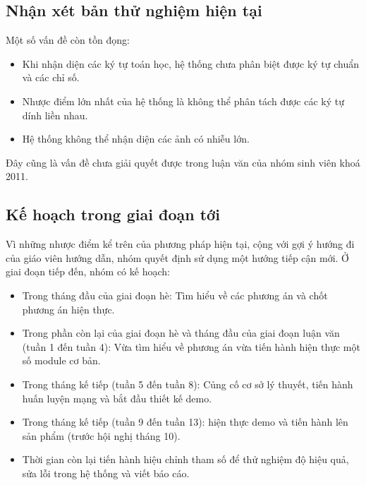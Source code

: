\documentclass[a4paper,12pt]{article}
\begin{document}
	\subsection{Nhận xét bản thử nghiệm hiện tại}
	
	Một số vấn đề còn tồn đọng: 
	\begin{itemize}
		\item Khi nhận diện các ký tự toán học, hệ thống chưa phân biệt được ký tự chuẩn và các chỉ số.
		\item Nhược điểm lớn nhất của hệ thống là không thể phân tách được các ký tự dính liền nhau.
		\item Hệ thống không thể nhận diện các ảnh có nhiễu lớn.
	\end{itemize}
	
	Đây cũng là vấn đề chưa giải quyết được trong luận văn của nhóm sinh viên khoá 2011.
	\subsection{Kế hoạch trong giai đoạn tới}
	Vì những nhược điểm kể trên của phương pháp hiện tại, cộng với gợi ý hướng đi của giáo viên hướng dẫn, nhóm quyết định sử dụng một hướng tiếp cận mới.
	Ở giai đoạn tiếp đến, nhóm có kế hoạch:
	\begin{itemize}
		\item Trong tháng đầu của giai đoạn hè: Tìm hiểu về các phương án và chốt phương án hiện thực.
		\item Trong phần còn lại của giai đoạn hè và tháng đầu của giai đoạn luận văn (tuần 1 đến tuần 4): Vừa tìm hiểu về phương án vừa tiến hành hiện thực một số module cơ bản.
		\item Trong tháng kế tiếp (tuần 5 đến tuần 8): Củng cố cơ sở lý thuyết, tiến hành huấn luyện mạng và bắt đầu thiết kế demo.
		\item Trong tháng kế tiếp (tuần 9 đến tuần 13): hiện thực demo và tiến hành lên sản phẩm (trước hội nghị tháng 10).
		\item Thời gian còn lại tiến hành hiệu chỉnh tham số để thử nghiệm độ hiệu quả, sửa lỗi trong hệ thống và viết báo cáo.
	\end{itemize}
	
	
	
	\newpage
	
	
\end{document}
